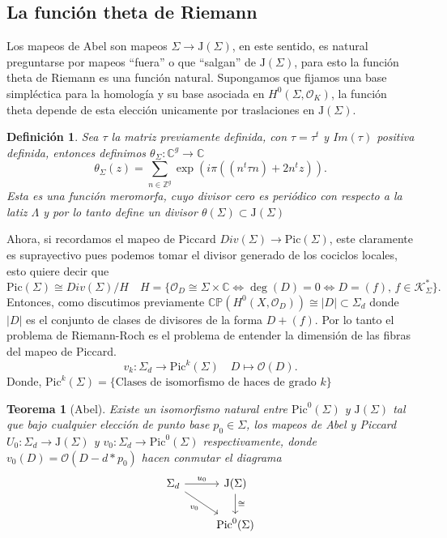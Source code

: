 \documentclass[letterpaper]{article}
\newtheorem{teorema}{Teorema}[section]
\newtheorem{def.}{Definici\'on}[section]
\newcommand{\zah}{\ensuremath{ \mathbb Z }}
\newcommand{\sig}{\ensuremath{\Sigma}}
\newcommand{\co}{\ensuremath{\mathbb C }}
\newcommand{\cp}{\ensuremath{\mathbb{CP}}}
\newcommand{\lnb}{\ensuremath{\mathcal{O}}}
\newcommand{\jac}{\ensuremath{\mathrm{J}(\sig)}}
\begin{document}
\subsection{La función theta de Riemann}
\noindent Los mapeos de Abel son mapeos \(\sig\rightarrow\jac\), en este sentido, es natural preguntarse por mapeos ``fuera'' o que ``salgan'' de \(\jac\), para esto la función theta de Riemann es una función natural. Supongamos que fijamos una base simpléctica para la homología y su base asociada en \(H^{0}(\sig,\lnb_{K})\), la función theta depende de esta elección unicamente por traslaciones en \(\jac\).
\begin{def.}
  Sea \(\tau\) la matriz previamente definida, con \(\tau=\tau^{t}\) y \(Im(\tau)\) positiva definida, entonces definimos \(\theta_{\sig}:\co^{g}\rightarrow\co\)
  \[
    \theta_{\sig}(z)=\sum_{n\in\zah^{g}}\exp(i\pi((n^{t}\tau n)+2n^{t}z)).
  \]
  \noindent Esta es una función meromorfa, cuyo divisor cero es periódico con respecto a la latiz \(\Lambda\) y por lo tanto define un divisor \(\theta(\sig)\subset\jac\)
\end{def.}
Ahora, si recordamos el mapeo de Piccard \(Div(\sig)\rightarrow\mathrm{Pic}(\sig)\), este claramente es suprayectivo pues podemos tomar el divisor generado de los cociclos locales, esto quiere decir que
\[
  \mathrm{Pic}(\sig)\cong Div(\sig)/H\quad H=\{\lnb_{D}\cong\sig\times\co\iff\deg(D)=0\iff D=(f),\,f\in\mathcal{K}^{*}_{\sig}\}.
\]
Entonces, como discutimos previamente \(\cp(H^{0}(X,\lnb_{D}))\cong |D|\subset\sig_{d}\) donde \(|D|\) es el conjunto de clases de divisores de la forma \(D+(f)\). Por lo tanto el problema de Riemann-Roch es el problema de entender la dimensión de las fibras del mapeo de Piccard.
\[
  v_{k}:\sig_{d}\rightarrow\mathrm{Pic}^{k}(\sig)\quad D\mapsto\lnb(D).
\]
\noindent Donde, \(\mathrm{Pic}^{k}(\sig)=\{\text{Clases de isomorfismo de haces de grado }k\}\)
\begin{teorema}[Abel]
  Existe un isomorfismo natural entre \(\mathrm{Pic}^{0}(\sig)\) y \(\jac\) tal que bajo cualquier elección de punto base \(p_{0}\in\sig\), los mapeos de Abel y Piccard \(U_{0}:\sig_{d}\rightarrow\jac\) y \(v_{0}:\sig_{d}\rightarrow\mathrm{Pic}^{0}(\sig)\) respectivamente, donde \(v_{0}(D)=\lnb(D-d*p_{0})\)  hacen conmutar el diagrama
  \begin{equation}
    \begin{tikzcd}
    \sig_{d} \arrow{r}{u_{0}} \arrow[swap]{dr}{v_{0}} & \jac \arrow{d}{\cong} \\
                                                & \mathrm{Pic}^{0}(\sig)
    \end{tikzcd}
\end{equation}
\end{teorema}
\end{document}
